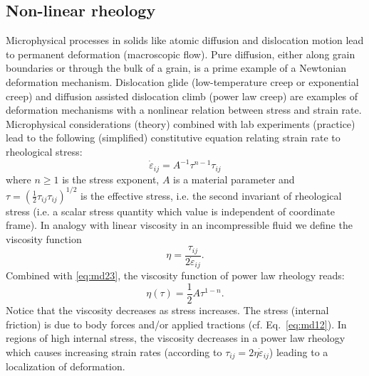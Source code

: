 \subsection{Non-linear rheology} 
Microphysical processes in solids like atomic diffusion and
dislocation motion lead to permanent deformation (macroscopic flow). Pure diffusion,
either along grain boundaries or through the bulk of a grain, is a prime example of a
Newtonian deformation mechanism. Dislocation glide (low-temperature creep or
exponential creep) and diffusion assisted dislocation climb (power law creep) are
examples of deformation mechanisms with a nonlinear relation between stress and strain
rate. Microphysical considerations (theory) combined with lab experiments (practice)
lead to the following (simplified) constitutive equation relating strain rate to rheological
stress:
\begin{equation}
\dot\varepsilon_{ij} = A^{-1} \tau^{n-1} \tau_{ij}
\label{eq:md23}
\end{equation}
where $n\ge 1$ is the stress exponent, $A$ is a material parameter
and $\tau=(\frac12 \tau_{ij}\tau_{ij})^{1/2}$ is the effective stress, i.e. the 
second invariant of rheological stress
(i.e. a scalar stress quantity which value is independent of coordinate frame). In analogy
with linear viscosity in an incompressible fluid we define the viscosity function
\begin{equation}
\eta=\frac{\tau_{ij}}{2 \dot\varepsilon_{ij}}.
\label{eq:md24}
\end{equation}
Combined with \eqref{eq:md23}, 
the viscosity function of power law rheology reads:
\begin{equation}
\eta(\tau) = \frac12 A \tau^{1-n}.
\label{eq:md25}
\end{equation}
Notice that the viscosity decreases as stress increases. The stress
(internal friction) is due to body forces and/or applied tractions (cf. Eq.~\eqref{eq:md12}). In regions of
high internal stress, the viscosity decreases in a power law rheology which causes
increasing strain rates (according to $\tau_{ij}=2\eta \dot\varepsilon_{ij}$) 
leading to a localization of deformation.


\vspace{0.5cm}
\vspace{0.5cm}


